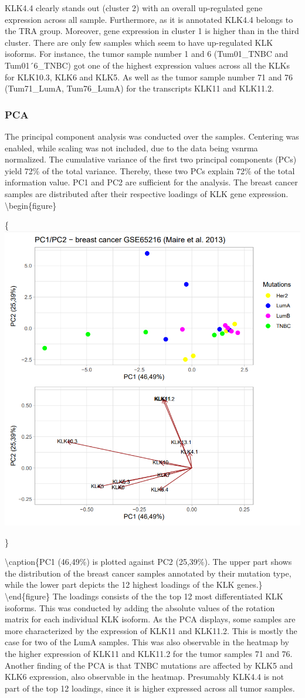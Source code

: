 \documentclass[
]{article}
\begin{document}
KLK4.4 clearly stands out (cluster 2) with an overall up-regulated gene
expression across all sample. Furthermore, as it is annotated KLK4.4
belongs to the TRA group. Moreover, gene expression in cluster 1 is
higher than in the third cluster. There are only few samples which seem
to have up-regulated KLK isoforms. For instance, the tumor sample number
1 and 6 (Tum01\_TNBC and Tum01´6\_TNBC) got one of the highest
expression values across all the KLKs for KLK10.3, KLK6 and KLK5. As
well as the tumor sample number 71 and 76 (Tum71\_LumA, Tum76\_LumA) for
the transcripts KLK11 and KLK11.2.

\hypertarget{pca}{%
\subsubsection{PCA}\label{pca}}

The principal component analysis was conducted over the samples.
Centering was enabled, while scaling was not included, due to the data
being vsnrma normalized. The cumulative variance of the first two
principal components (PCs) yield 72\% of the total variance. Thereby,
these two PCs explain 72\% of the total information value. PC1 and PC2
are sufficient for the analysis. The breast cancer samples are
distributed after their respective loadings of KLK gene expression.\\
\textbackslash begin\{figure\}

\{\centering \includegraphics[width=0.5\linewidth]{images/PCAplot_breast}

\}

\textbackslash caption\{PC1 (46,49\%) is plotted against PC2 (25,39\%).
The upper part shows the distribution of the breast cancer samples
annotated by their mutation type, while the lower part depicts the 12
highest loadings of the KLK genes.\}\label{fig:PCA plot - breast }
\textbackslash end\{figure\} The loadings consists of the the top 12
most differentiated KLK isoforms. This was conducted by adding the
absolute values of the rotation matrix for each individual KLK isoform.
As the PCA displays, some samples are more characterized by the
expression of KLK11 and KLK11.2. This is mostly the case for two of the
LumA samples. This was also observable in the heatmap by the higher
expression of KLK11 and KLK11.2 for the tumor samples 71 and 76. Another
finding of the PCA is that TNBC mutations are affected by KLK5 and KLK6
expression, also observable in the heatmap. Presumably KLK4.4 is not
part of the top 12 loadings, since it is higher expressed across all
tumor samples.
\end{document}
